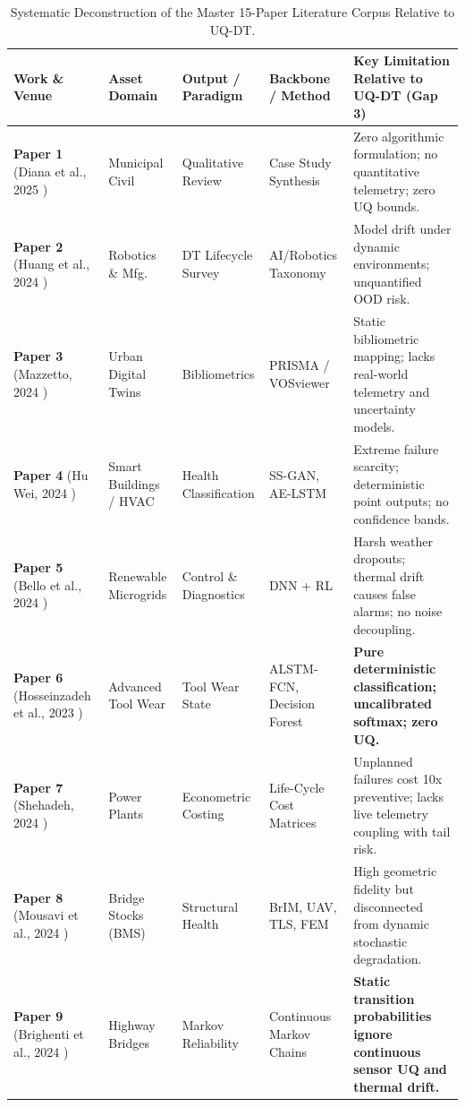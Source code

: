 \documentclass[journal,10pt,twocolumn]{article}
\begin{document}
\begin{table}[t]
\caption{Systematic Deconstruction of the Master 15-Paper Literature Corpus Relative to UQ-DT.}
\label{tab:corpus}
\centering
\small
\begin{tabular}{lp{3.2cm}p{3.2cm}p{3.4cm}p{4.2cm}}
\toprule
\textbf{Work \& Venue} & \textbf{Asset Domain} & \textbf{Output / Paradigm} & \textbf{Backbone / Method} & \textbf{Key Limitation Relative to UQ-DT (Gap 3)} \\
\midrule
\textbf{Paper 1} (Diana et al., 2025 \cite{diana2025role}) & Municipal Civil & Qualitative Review & Case Study Synthesis & Zero algorithmic formulation; no quantitative telemetry; zero UQ bounds. \\
\textbf{Paper 2} (Huang et al., 2024 \cite{huang2024survey}) & Robotics \& Mfg. & DT Lifecycle Survey & AI/Robotics Taxonomy & Model drift under dynamic environments; unquantified OOD risk. \\
\textbf{Paper 3} (Mazzetto, 2024 \cite{mazzetto2024review}) & Urban Digital Twins & Bibliometrics & PRISMA / VOSviewer & Static bibliometric mapping; lacks real-world telemetry and uncertainty models. \\
\textbf{Paper 4} (Hu Wei, 2024 \cite{huwei2024thesis}) & Smart Buildings / HVAC & Health Classification & SS-GAN, AE-LSTM & Extreme failure scarcity; deterministic point outputs; no confidence bands. \\
\textbf{Paper 5} (Bello et al., 2024 \cite{bello2024digital}) & Renewable Microgrids & Control \& Diagnostics & DNN + RL & Harsh weather dropouts; thermal drift causes false alarms; no noise decoupling. \\
\textbf{Paper 6} (Hosseinzadeh et al., 2023 \cite{hosseinzadeh2023benchmarking}) & Advanced Tool Wear & Tool Wear State & ALSTM-FCN, Decision Forest & \textbf{Pure deterministic classification; uncalibrated softmax; zero UQ.} \\
\textbf{Paper 7} (Shehadeh, 2024 \cite{shehadeh2024economic}) & Power Plants & Econometric Costing & Life-Cycle Cost Matrices & Unplanned failures cost 10x preventive; lacks live telemetry coupling with tail risk. \\
\textbf{Paper 8} (Mousavi et al., 2024 \cite{mousavi2024evolution}) & Bridge Stocks (BMS) & Structural Health & BrIM, UAV, TLS, FEM & High geometric fidelity but disconnected from dynamic stochastic degradation. \\
\textbf{Paper 9} (Brighenti et al., 2024 \cite{brighenti2024predictive}) & Highway Bridges & Markov Reliability & Continuous Markov Chains & \textbf{Static transition probabilities ignore continuous sensor UQ and thermal drift.} \\

\end{tabular}
\end{table}
\end{document}

